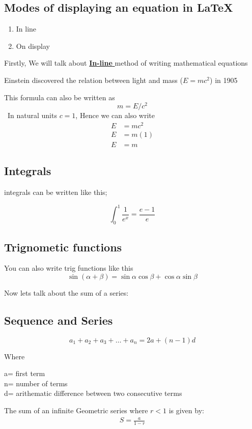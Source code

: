 \documentclass[10pt]{article}
\begin{document}
\subsection{Modes of displaying an equation in \LaTeX}
\begin{enumerate}
    \item In line
    \item On display
\end{enumerate}

Firstly, We will talk about \underline{\textbf{In-line} }method of writing mathematical equations

Einstein discovered the relation between light and mass {\large(\(E=mc^2\))} in 1905

This formula can also be written as\[m=E/c^2\]\
In natural units \(c=1\), Hence we can also write
{\Large
\begin{align*}
    \nonumber
    E&=mc^2  \\
    \nonumber
    E&=m(1)\\
    E&=m
\end{align*}
}
\subsection{Integrals}
integrals can be written like this;

{\large\[\int_0^1\frac{1}{e^x}=\frac{e-1}{e}\]}
\subsection{Trignometic functions}
You can also write trig functions like this 
{\Large\[\sin({\alpha+\beta})=\sin{\alpha}\cos{\beta}+\cos{\alpha}\sin{\beta}\]}

Now lets talk about the sum of a series:
\subsection{Sequence and Series}
{\large\[a_1+a_2+a_3+\dots+a_n=2a+(n-1)d\]}

Where

\begin{flushleft}
    a= first term\\
    n= number of terms\\
    d= arithematic difference between two consecutive terms
\end{flushleft}

The sum of an infinite Geometric series where \(r<1\) is given by:
\begin{align}
S=\frac{a}{1-r}
\end{align}
\end{document}

